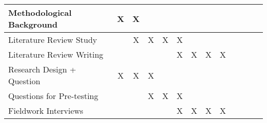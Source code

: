 \documentclass[a4paper,10pt]{article}
\begin{document}
\begin{table}[]
\begin{tabular}{|l|c|c|c|c|c|c|c|c|c|c|c|c|}
Methodological Background            & X                        &  X                         &                           &                             &                                &                              &                               &                               &                              &                               &                            &                            \\ \hline
Literature Review Study              &                         & X                         & X                         & X                           & X                              &                              &                               &                               &                              &                               &                            &                            \\ \hline
Literature Review Writing            &                          &                           &                           &                             & X                              & X                            & X                             & X                             &                              &                               &                            &                            \\ \hline
Research Design + Question           & X                        & X                         & X                         &                             &                                &                              &                               &                               &                              &                               &                            &                            \\ \hline
Questions for Pre-testing            &                          &                           & X                         & X                           & X                              &                              &                               &                               &                              &                               &                            &                            \\ \hline
Fieldwork Interviews                 &                          &                           &                           &                             & X                              & X                            & X                             & X                             &                              &                               &                            &                            \\ \hline

\end{tabular}
\end{table}
\end{document}
